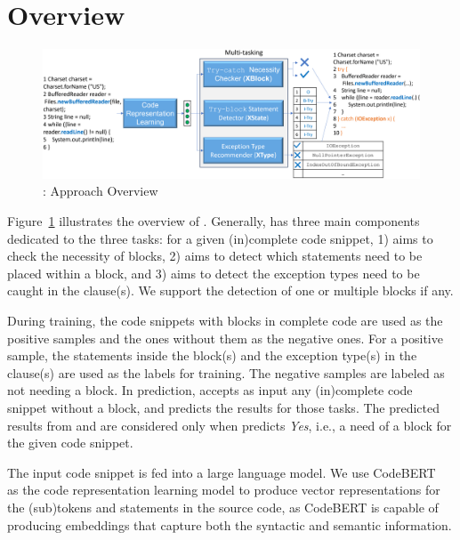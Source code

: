\section{{\tool} Overview}
\label{sec:overview}

\begin{figure}[t] %
\begin{center}
\includegraphics[width=5.7in]{overview-7.png} %
\vspace{-10pt}
\caption{{\tool}: Approach Overview}
\label{overview}
\end{center}
\end{figure}

Figure~\ref{overview} illustrates the overview of {\tool}. Generally,
{\tool} has three main components dedicated to the three tasks: for a
given (in)complete code snippet, 1) {\xblock} aims to check the
necessity of  blocks, 2) {\xstate} aims to detect which
statements need to be placed within a  block, and 3) {\xtype}
aims to detect the exception types need to be caught in the
 clause(s). We support the detection of one or multiple
 blocks if any.

During training, the code snippets with  blocks in
complete code are used as the positive samples and the ones without
them as the negative ones. For a positive sample, the statements
inside the  block(s) and the exception type(s) in the
 clause(s) are used as the labels for training. The negative
samples are labeled as not needing a  block. In
prediction, {\tool} accepts as input any (in)complete code
snippet without a  block, and predicts the results for
those tasks. The predicted results from {\xstate} and {\xtype} are
considered only when {\xblock} predicts {\em Yes}, i.e., a need of a
 block for the given code snippet.

The input code snippet is fed into a large language model. We use
CodeBERT~\cite{codebert-emnlp20} as the code representation learning
model to produce vector representations for the (sub)tokens and
statements in the source code, as CodeBERT is capable of producing
embeddings that capture both the syntactic and semantic information.

